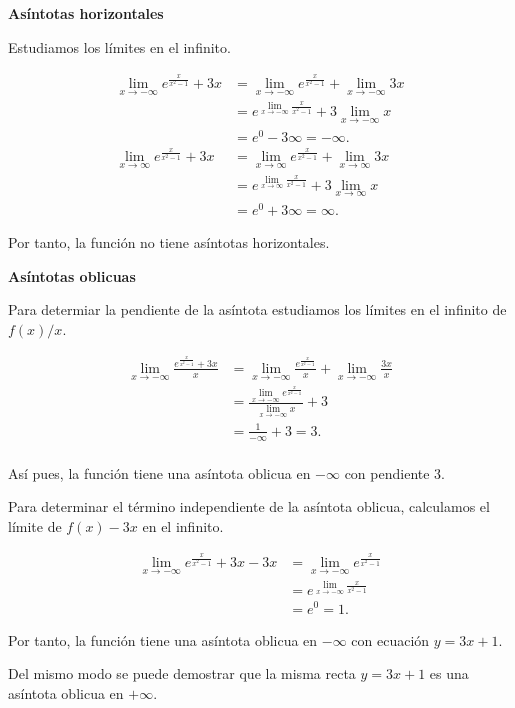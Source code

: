 \documentclass[
  spanish,
  a4paper,
]{scrreport}
\theoremstyle{definition}
\theoremstyle{remark}
\begin{document}
\begin{tcolorbox}
\textbf{Asíntotas horizontales}

Estudiamos los límites en el infinito.

\begin{align*}
\lim_{x\to -\infty} e^{\frac{x}{x^2-1}}+3x
&= \lim_{x\to -\infty} e^{\frac{x}{x^2-1}}+\lim_{x\to -\infty} 3x \\
&= e^{\lim_{x\to -\infty}\frac{x}{x^2-1}}+3\lim_{x\to -\infty} x \\
&= e^0-3\infty = -\infty. \\
\lim_{x\to \infty} e^{\frac{x}{x^2-1}}+3x
&= \lim_{x\to \infty} e^{\frac{x}{x^2-1}}+\lim_{x\to \infty} 3x \\ 
&= e^{\lim_{x\to \infty}\frac{x}{x^2-1}}+3\lim_{x\to \infty} x \\
&= e^0+3\infty = \infty.
\end{align*}

Por tanto, la función no tiene asíntotas horizontales.

\textbf{Asíntotas oblicuas}

Para determiar la pendiente de la asíntota estudiamos los límites en el
infinito de \(f(x)/x\).

\begin{align*}
\lim_{x\to -\infty} \frac{e^{\frac{x}{x^2-1}}+3x}{x}
&= \lim_{x\to -\infty} \frac{e^{\frac{x}{x^2-1}}}{x}+\lim_{x\to -\infty} \frac{3x}{x} \\
&= \frac{\lim_{x\to -\infty} e^{\frac{x}{x^2-1}}}{\lim_{x\to -\infty} x}+3 \\
&= \frac{1}{-\infty}+3 
= 3. \\
\end{align*}

Así pues, la función tiene una asíntota oblicua en \(-\infty\) con
pendiente \(3\).

Para determinar el término independiente de la asíntota oblicua,
calculamos el límite de \(f(x)-3x\) en el infinito.

\begin{align*}
\lim_{x\to -\infty} e^{\frac{x}{x^2-1}}+3x-3x
&= \lim_{x\to -\infty} e^{\frac{x}{x^2-1}} \\
&= e^{\lim_{x\to -\infty}\frac{x}{x^2-1}} \\
&= e^0 = 1.
\end{align*}

Por tanto, la función tiene una asíntota oblicua en \(-\infty\) con
ecuación \(y=3x+1\).

Del mismo modo se puede demostrar que la misma recta \(y=3x+1\) es una
asíntota oblicua en \(+\infty\).

\end{tcolorbox}
\end{document}
